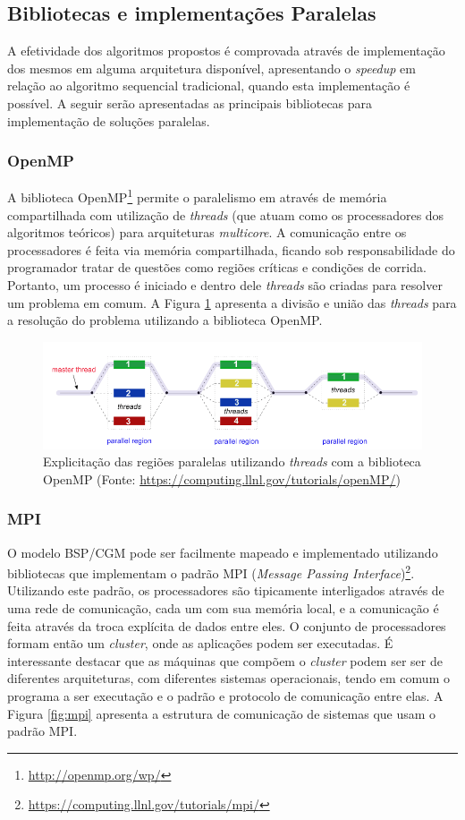 \documentclass[a4paper, 12pt] {article}
\begin{document}
\subsection{Bibliotecas e implementações Paralelas}

A efetividade dos algoritmos propostos é comprovada através de implementação dos
mesmos em alguma arquitetura disponível, apresentando o \textit{speedup} em
relação ao algoritmo sequencial tradicional, quando esta implementação é
possível. A seguir serão apresentadas as principais bibliotecas para
implementação de soluções paralelas.

\subsubsection{OpenMP}

A biblioteca OpenMP\footnote{\url{http://openmp.org/wp/}} permite o paralelismo
em através de memória compartilhada com utilização de \textit{threads} (que atuam
como os processadores dos algoritmos teóricos) para arquiteturas
\textit{multicore}. A comunicação entre os processadores é feita via memória
compartilhada, ficando sob responsabilidade do programador tratar de questões como regiões críticas e
condições de corrida. Portanto, um processo é iniciado e dentro dele
\textit{threads} são criadas para resolver um problema em comum. A Figura
\ref{fig:openmp} apresenta a divisão e união das \textit{threads} para a
resolução do problema utilizando a biblioteca OpenMP.

\begin{figure}[ht]
\centering
\includegraphics[width=.6\textwidth]{fork_join2.png}
\caption{Explicitação das regiões paralelas utilizando \textit{threads} com a
biblioteca OpenMP (Fonte: \url{https://computing.llnl.gov/tutorials/openMP/})}
\label{fig:openmp}
\end{figure}

\subsubsection{MPI}

O modelo BSP/CGM pode ser facilmente mapeado e implementado utilizando
bibliotecas que implementam o padrão MPI (\textit{Message Passing
Interface})\footnote{\url{https://computing.llnl.gov/tutorials/mpi/}}.
Utilizando este padrão, os processadores são tipicamente interligados através de uma rede de
comunicação, cada um com sua memória local, e a comunicação é feita através da
troca explícita de dados entre eles. O conjunto de processadores formam então um
\textit{cluster}, onde as aplicações podem ser executadas. É interessante
destacar que as máquinas que compõem o \textit{cluster} podem ser ser de
diferentes arquiteturas, com diferentes sistemas operacionais, tendo em comum o
programa a ser executação e o padrão e protocolo de comunicação entre elas. A
Figura \ref{fig:mpi} apresenta a estrutura de comunicação de sistemas que usam o
padrão MPI.
\end{document}
